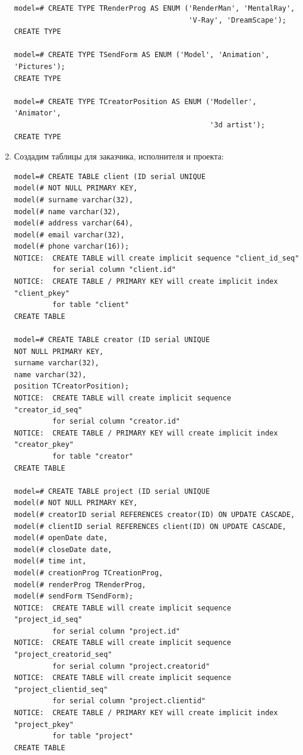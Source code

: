 \documentclass[a4paper, 12pt, titlepage]{article}
\begin{document}
\begin{otherlanguage}{russian}
\begin{enumerate}
{\begin{verbatim}
model=# CREATE TYPE TRenderProg AS ENUM ('RenderMan', 'MentalRay', 
                                         'V-Ray', 'DreamScape');
CREATE TYPE

model=# CREATE TYPE TSendForm AS ENUM ('Model', 'Animation', 'Pictures');
CREATE TYPE

model=# CREATE TYPE TCreatorPosition AS ENUM ('Modeller', 'Animator', 
                                              '3d artist');
CREATE TYPE
\end{verbatim}}

\newpage

\item Создадим таблицы для заказчика, исполнителя и проекта:
{\small
\begin{verbatim}
model=# CREATE TABLE client (ID serial UNIQUE
model(# NOT NULL PRIMARY KEY,
model(# surname varchar(32),
model(# name varchar(32),
model(# address varchar(64),
model(# email varchar(32),
model(# phone varchar(16));
NOTICE:  CREATE TABLE will create implicit sequence "client_id_seq" 
         for serial column "client.id"
NOTICE:  CREATE TABLE / PRIMARY KEY will create implicit index "client_pkey" 
         for table "client"
CREATE TABLE

model=# CREATE TABLE creator (ID serial UNIQUE
NOT NULL PRIMARY KEY,
surname varchar(32),
name varchar(32),
position TCreatorPosition);
NOTICE:  CREATE TABLE will create implicit sequence "creator_id_seq" 
         for serial column "creator.id"
NOTICE:  CREATE TABLE / PRIMARY KEY will create implicit index "creator_pkey" 
         for table "creator"
CREATE TABLE

model=# CREATE TABLE project (ID serial UNIQUE
model(# NOT NULL PRIMARY KEY,
model(# creatorID serial REFERENCES creator(ID) ON UPDATE CASCADE,
model(# clientID serial REFERENCES client(ID) ON UPDATE CASCADE,
model(# openDate date,
model(# closeDate date,
model(# time int,
model(# creationProg TCreationProg,
model(# renderProg TRenderProg,
model(# sendForm TSendForm);
NOTICE:  CREATE TABLE will create implicit sequence "project_id_seq" 
         for serial column "project.id"
NOTICE:  CREATE TABLE will create implicit sequence "project_creatorid_seq" 
         for serial column "project.creatorid"
NOTICE:  CREATE TABLE will create implicit sequence "project_clientid_seq" 
         for serial column "project.clientid"
NOTICE:  CREATE TABLE / PRIMARY KEY will create implicit index "project_pkey" 
         for table "project"
CREATE TABLE 
\end{verbatim}}


\end{enumerate}
\end{otherlanguage}
\end{document}

